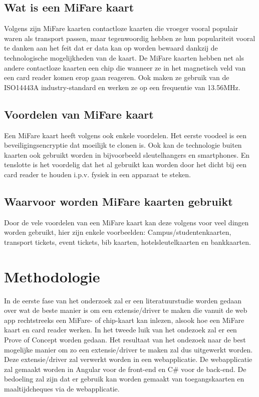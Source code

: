 \documentclass{hogent-article}
\begin{document}
\subsection{Wat is een MiFare kaart}
Volgens \textcite{Digitalid} zijn MiFare kaarten contactloze kaarten die vroeger vooral populair waren als transport passen, maar tegenwoordig hebben ze hun populariteit vooral te danken aan het feit dat er data kan op worden bewaard dankzij de technologische mogelijkheden van de kaart.
De MiFare kaarten hebben net als andere contactloze kaarten een chip die wanneer ze in het magnetisch veld van een card reader komen erop gaan reageren. Ook maken ze gebruik van de ISO14443A industry-standard en werken ze op een frequentie van 13.56MHz.

\subsection{Voordelen van MiFare kaart}
Een MiFare kaart heeft volgens \textcite{Digitalid} ook enkele voordelen. Het eerste voodeel is een beveiligingsencryptie dat moeilijk te clonen is. Ook kan de technologie buiten kaarten ook gebruikt worden in bijvoorbeeld sleutelhangers en smartphones. En tenslotte is het voordelig dat het al gebruikt kan worden door het dicht bij een card reader te houden i.p.v. fysiek in een apparaat te steken.

\subsection{Waarvoor worden MiFare kaarten gebruikt}
Door de vele voordelen van een MiFare kaart kan deze volgens \textcite{Digitalid} voor veel dingen worden gebruikt, hier zijn enkele voorbeelden: Campus/studentenkaarten, transport tickets, event tickets, bib kaarten, hotelsleutelkaarten en bankkaarten.

\section{Methodologie}
In de eerste fase van het onderzoek zal er een literatuurstudie worden gedaan over wat de beste manier is om een extensie/driver te maken die vanuit de web app rechtstreeks een MiFare- of chip-kaart kan inlezen, alsook hoe een MiFare kaart en card reader werken. In het tweede luik van het ondezoek zal er een Prove of Concept worden gedaan. Het resultaat van het ondezoek naar de best mogelijke manier om zo een extensie/driver te maken zal dus uitgewerkt worden. Deze extensie/driver zal verwerkt worden in een webapplicatie. De webapplicatie zal gemaakt worden in Angular voor de front-end en C\# voor de back-end. De bedoeling zal zijn dat er gebruik kan worden gemaakt van toegangskaarten en maaltijdcheques via de webapplicatie.
\end{document}
